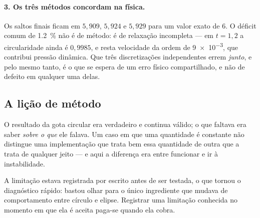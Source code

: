 \paragraph{3. Os tr\^es m\'etodos concordam na f\'isica.} Os saltos finais ficam
em $5{,}909$, $5{,}924$ e $5{,}929$ para um valor exato de $6$. O d\'eficit comum
de \SI{1.2}{\percent} n\~ao \'e de m\'etodo: \'e de relaxa\c{c}\~ao incompleta ---
em $t=1{,}2$ a circularidade ainda \'e $0{,}9985$, e resta velocidade da ordem de
\num{9e-3}, que contribui press\~ao din\^amica. Que tr\^es discretiza\c{c}\~oes
independentes errem \emph{junto}, e pelo mesmo tanto, \'e o que se espera de um
erro f\'isico compartilhado, e n\~ao de defeito em qualquer uma delas.

\subsection{A li\c{c}\~ao de m\'etodo}

O resultado da gota circular era verdadeiro e continua v\'alido; o que faltava
era saber \emph{sobre o que} ele falava. Um caso em que uma quantidade \'e
constante n\~ao distingue uma implementa\c{c}\~ao que trata bem essa quantidade
de outra que a trata de qualquer jeito --- e aqui a diferen\c{c}a era entre
funcionar e ir \`a instabilidade.

A limita\c{c}\~ao estava registrada por escrito antes de ser testada, o que
tornou o diagn\'ostico r\'apido: bastou olhar para o \'unico ingrediente que
mudava de comportamento entre c\'irculo e elipse. Registrar uma limita\c{c}\~ao
conhecida no momento em que ela \'e aceita paga-se quando ela cobra.
